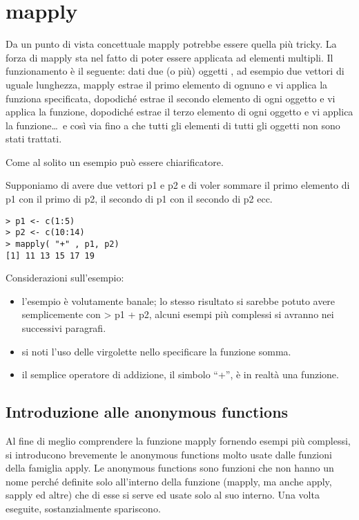 \section{mapply}

Da un punto di vista concettuale \textsf{mapply} potrebbe essere quella più tricky. La forza di \textsf{mapply} sta nel fatto di poter essere applicata ad elementi multipli. Il funzionamento è il seguente: dati due (o più) oggetti \erre, ad esempio due vettori di uguale lunghezza, \textsf{mapply} estrae il primo elemento di ognuno e vi applica la funziona specificata, dopodiché estrae il secondo elemento di ogni oggetto e vi applica la funzione, dopodiché estrae il terzo elemento di ogni oggetto e vi applica la funzione\dots\ e così via fino a che tutti gli elementi di tutti gli oggetti non sono stati trattati.

Come al solito un esempio può essere chiarificatore.

Supponiamo di avere due vettori p1 e p2 e di voler sommare il primo elemento di p1 con il primo di p2, il secondo di p1 con il secondo di p2 ecc.

\begin{lstlisting}
> p1 <- c(1:5)
> p2 <- c(10:14)
> mapply( "+" , p1, p2)
[1] 11 13 15 17 19
\end{lstlisting}

Considerazioni sull'esempio:
\begin{itemize}
\item l'esempio è volutamente banale; lo stesso risultato si sarebbe potuto avere semplicemente con \textsf{> p1 + p2}, alcuni esempi più complessi si avranno nei successivi paragrafi. 
\item si noti l'uso delle virgolette nello specificare la funzione somma.
\item il semplice operatore di addizione, il simbolo ``+'', è in realtà una funzione.
\end{itemize}

\subsection{Introduzione alle anonymous functions}

Al fine di meglio comprendere la funzione \textsf{mapply} fornendo esempi più complessi, si introducono brevemente le anonymous functions molto usate dalle funzioni della famiglia \textsf{apply}. Le anonymous functions sono funzioni che non hanno un nome perché definite solo all'interno della funzione (\textsf{mapply}, ma anche \textsf{apply}, \textsf{sapply} ed altre) che di esse si serve ed usate solo al suo interno. Una volta eseguite, sostanzialmente spariscono.

